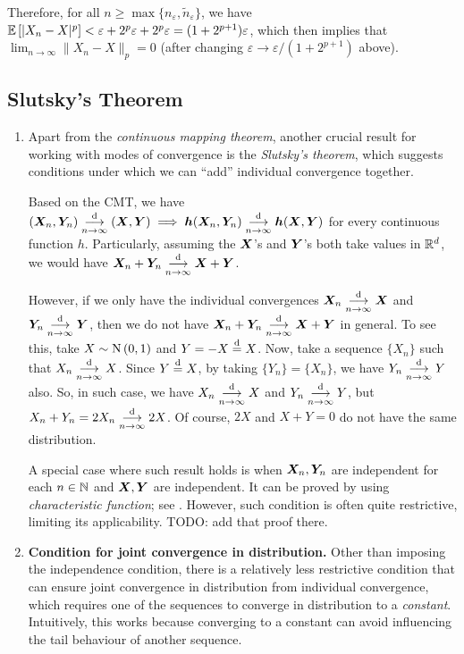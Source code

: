 \begin{enumerate}
\begin{pf}
Therefore, for all \(n\ge\max\{n_{\varepsilon},\widetilde{n}_{\varepsilon}\}\),
we have \(\mathbb{E}\left[|X_n-X|^{p}\right]<\varepsilon+2^p\varepsilon+2^p
\varepsilon=(1+2^{p+1})\varepsilon\), which then implies that
\(\lim_{n\to\infty}\|X_n-X\|_{p}=0\) (after changing
\(\varepsilon\to\varepsilon/(1+2^{p+1})\) above).
\end{pf}
\end{enumerate}
\subsection{Slutsky's Theorem}
\begin{enumerate}
\item Apart from the \emph{continuous mapping theorem}, another crucial result
for working with modes of convergence is the \emph{Slutsky's theorem}, which
suggests conditions under which we can ``add'' individual convergence together.

Based on the CMT, we have \((\bm{X}_n,\bm{Y}_n)\underset{n\to\infty}{\overset{\text{d}}{\longrightarrow}} (\bm{X},\bm{Y})\implies 
\bm{h}(\bm{X}_n,\bm{Y}_n)\underset{n\to\infty}{\overset{\text{d}}{\longrightarrow}} \bm{h}(\bm{X},\bm{Y})\) for every
continuous function \(h\). Particularly, assuming the \(\bm{X}\)'s and
\(\bm{Y}\)'s both take values in \(\mathbb{R}^d\), we would have
\(\bm{X}_n+\bm{Y}_n\underset{n\to\infty}{\overset{\text{d}}{\longrightarrow}} \bm{X}+\bm{Y}\).

However, if we only have the individual convergences \(\bm{X}_n\underset{n\to\infty}{\overset{\text{d}}{\longrightarrow}}
\bm{X}\) and \(\bm{Y}_n\underset{n\to\infty}{\overset{\text{d}}{\longrightarrow}} \bm{Y}\), then we do not have
\(\bm{X}_n+\bm{Y}_n\underset{n\to\infty}{\overset{\text{d}}{\longrightarrow}} \bm{X}+\bm{Y}\) in general. To see this,
take \(X\sim\operatorname{N}\left(0,1\right)\) and \(Y=-X\overset{\text{d}}= X\). Now, take a sequence \(\{X_n\}\)
such that \(X_n\underset{n\to\infty}{\overset{\text{d}}{\longrightarrow}} X\). Since \(Y\overset{\text{d}}= X\), by taking \(\{Y_n\}=\{X_n\}\),
we have \(Y_n\underset{n\to\infty}{\overset{\text{d}}{\longrightarrow}} Y\) also. So, in such case, we have \(X_n\underset{n\to\infty}{\overset{\text{d}}{\longrightarrow}} X\) and \(Y_n\underset{n\to\infty}{\overset{\text{d}}{\longrightarrow}} Y\),
but \(X_n+Y_n=2X_n\underset{n\to\infty}{\overset{\text{d}}{\longrightarrow}} 2X\). Of course, \(2X\) and \(X+Y=0\) do not have the
same distribution.
\begin{note}
A special case where such result holds is when \(\bm{X}_n,\bm{Y}_n\) are
independent for each \(n\in\mathbb{N}\) and \(\bm{X},\bm{Y}\) are independent.  It
can be proved by using \emph{characteristic function}; see
. However, such condition is often quite restrictive,
limiting its applicability. TODO: add that proof there.
\end{note}
\item \textbf{Condition for joint convergence in distribution.}
Other than imposing the independence condition, there is a relatively less
restrictive condition that can ensure joint convergence in distribution from
individual convergence, which requires one of the sequences to converge in
distribution to a \emph{constant}. Intuitively, this works because converging
to a constant can avoid influencing the tail behaviour of another sequence.


\end{enumerate}
